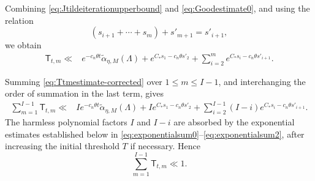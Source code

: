 \documentclass[reqno,11pt]{amsart}
\numberwithin{equation}{section}
\theoremstyle{definition}
\theoremstyle{remark}
\begin{document}
Combining \eqref{eq:Jtildeiterationupperbound} and \eqref{eq:Goodestimate0}, and using the relation
$$
(s_{i+1}+\cdots+s_m)+s'_{m+1}
=
s'_{i+1},
$$
we obtain
\begin{align}
\mathsf T_{t,m}
\ll{}&
e^{-c_n\theta t}
\widetilde{\alpha}_{\eta,M}(\Lambda) + e^{C_*s_1-c_n\theta s'_2}
+
\sum_{i=2}^m
e^{C_*s_i
-c_n\theta s'_{i+1}}.
\label{eq:Ttmestimate-corrected}
\end{align}

Summing \eqref{eq:Ttmestimate-corrected} over $1\le m\le I-1$, and
interchanging the order of summation in the last term, gives
$$
\begin{aligned}
\sum_{m=1}^{I-1}\mathsf T_{t,m}
\ll{}&
I e^{-c_n\theta t}
\widetilde{\alpha}_{\eta,M}(\Lambda)  +
I e^{C_*s_1-c_n\theta s'_2} +
\sum_{i=2}^{I-1}
(I-i)
e^{C_*s_i
-c_n\theta s'_{i+1}}.
\end{aligned}
$$
The harmless polynomial factors $I$ and $I-i$ are absorbed by the 
exponential estimates established below in
\eqref{eq:exponentialsum0}--\eqref{eq:exponentialsum2}, after increasing the
initial threshold $T$ if necessary. Hence
\begin{equation}\label{eq:Dtmestimate}
\sum_{m=1}^{I-1}\mathsf T_{t,m}\ll 1.
\end{equation}
\end{document}
